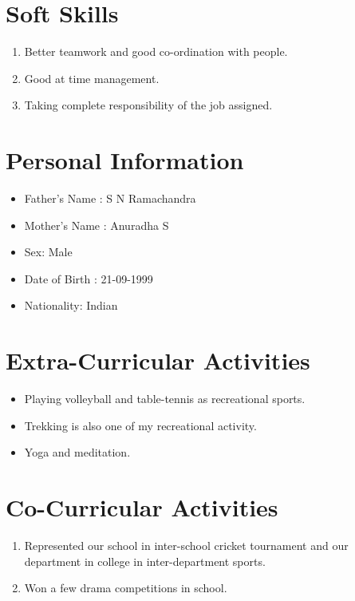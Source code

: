 \documentclass{article}
\begin{document}
	\section{Soft Skills}
	\begin{enumerate}
		\item Better teamwork and good co-ordination with people.
		\item Good at time management.
		\item Taking complete responsibility of the job assigned.
	\end{enumerate}

	\section{Personal Information}
	\begin{itemize}
		\item Father’s Name : S N Ramachandra
		\item Mother’s Name : Anuradha S
		\item Sex: Male
		\item Date of Birth : 21-09-1999
		\item Nationality: Indian
	\end{itemize}

	\section{Extra-Curricular Activities}
	\begin{itemize}
		\item Playing volleyball and table-tennis as recreational sports.
		\item Trekking is also one of my recreational activity.
		\item Yoga and meditation.
	\end{itemize}

	\section{Co-Curricular Activities}
	\begin{enumerate}
		\item  Represented our school in inter-school cricket tournament and our department in college in inter-department sports.
		\item Won a few drama competitions in school.
	\end{enumerate}

\end{document}

